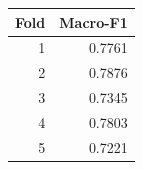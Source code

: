 \begin{tabular}{rr}
\toprule
Fold & Macro-F1 \\
\midrule
1 & 0.7761 \\
2 & 0.7876 \\
3 & 0.7345 \\
4 & 0.7803 \\
5 & 0.7221 \\
\bottomrule
\end{tabular}
